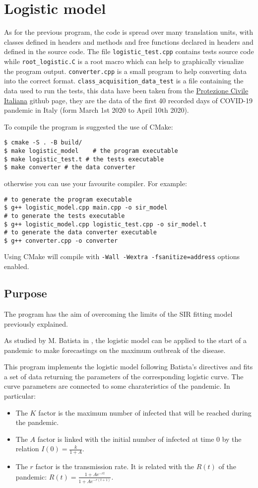 \section{Logistic model}

As for the previous program, the code is spread over many translation units, with classes defined in headers and methods and free functions declared in headers and defined in the source code. The file \verb!logistic_test.cpp! contains tests source code while \verb!root_logistic.C! is a root macro which can help to graphically visualize the program output. \verb!converter.cpp! is a small program to help converting data into the correct format. \verb!class_acquisition_data_test! is a file containing the data used to run the tests, this data have been taken from the \href{https://github.com/pcm-dpc/COVID-19}{Protezione Civile Italiana} github page, they are the data of the first 40 recorded days of COVID-19 pandemic in Italy (form March 1st 2020 to April 10th 2020).

To compile the program is suggested the use of CMake:
\begin{verbatim}
$ cmake -S . -B build/
$ make logistic_model    # the program executable
$ make logistic_test.t # the tests executable
$ make converter # the data converter
\end{verbatim}
otherwise you can use your favourite compiler. For example:
\begin{verbatim}
# to generate the program executable
$ g++ logistic_model.cpp main.cpp -o sir_model
# to generate the tests executable
$ g++ logistic_model.cpp logistic_test.cpp -o sir_model.t
# to generate the data converter executable
$ g++ converter.cpp -o converter
\end{verbatim}
Using CMake will compile with \verb!-Wall -Wextra -fsanitize=address! options enabled.

\subsection{Purpose}

The program has the aim of overcoming the limits of the SIR fitting model previously explained.

As studied by M. Batista in \cite{Batista : Logistic}, the logistic model can be applied to the start of a pandemic to make forecastings on the maximum outbreak of the disease.

This program implements the logistic model following Batista's directives and fits a set of data returning the parameters of the corresponding logistic curve. The curve parameters are connected to some charateristics of the pandemic. In particular:
\begin{itemize}
\item The $K$ factor is the maximum number of infected that will be reached during the pandemic.
\item The $A$ factor is linked with the initial number of infected at time 0 by the relation $I(0) = \frac{k}{1+A}$.
\item The $r$ factor is the transmission rate. It is related with the $R(t)$ of the pandemic: $R(t)=\frac{1+Ae^{-rt}}{1+Ae^{-r(t+1)}}$.
\end{itemize} 

